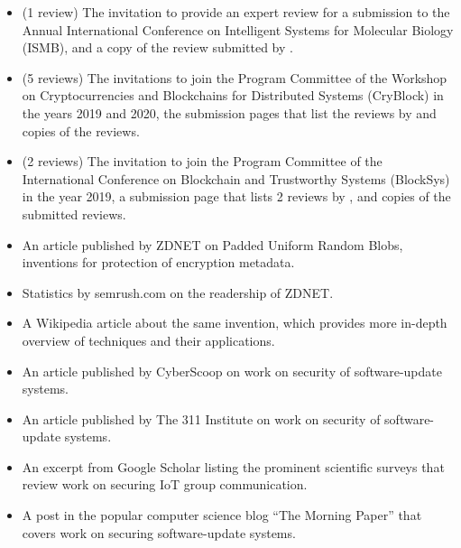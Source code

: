 \begin{itemize}
	\item (1 review) The invitation to provide an expert review for a
	submission to the Annual International Conference on Intelligent Systems for
	Molecular Biology (ISMB), and a copy of the review submitted by \dr.
	\item (5 reviews) The invitations to join the Program Committee of the
	Workshop on Cryptocurrencies and Blockchains for Distributed Systems
	(CryBlock) in the years 2019 and 2020, the submission pages that list the
	reviews by \dr and copies of the reviews.
	\item (2 reviews) The invitation to join the Program Committee of the
	International Conference on Blockchain and Trustworthy Systems (BlockSys) in
	the year 2019, a submission page that lists 2 reviews by \dr, and copies of
	the submitted reviews.
\end{itemize}




\vspace{-7em}
\begin{itemize}
	\item An article published by ZDNET on Padded Uniform Random Blobs, \drs
	inventions for protection of encryption metadata.
	\item Statistics by semrush.com on the readership of ZDNET.
	\item A Wikipedia article about the same invention, which provides more
	in-depth overview of techniques and their applications.
	\item An article published by CyberScoop on \drs work on security of
	software-update systems.
	\item An article published by The 311 Institute on \drs work on security of
	software-update systems.
	\item An excerpt from Google Scholar listing the prominent scientific
	surveys that review \drs work on securing IoT group communication.
	\item A post in the popular computer science blog ``The Morning Paper'' that covers \drs work on securing software-update systems.
\end{itemize}

